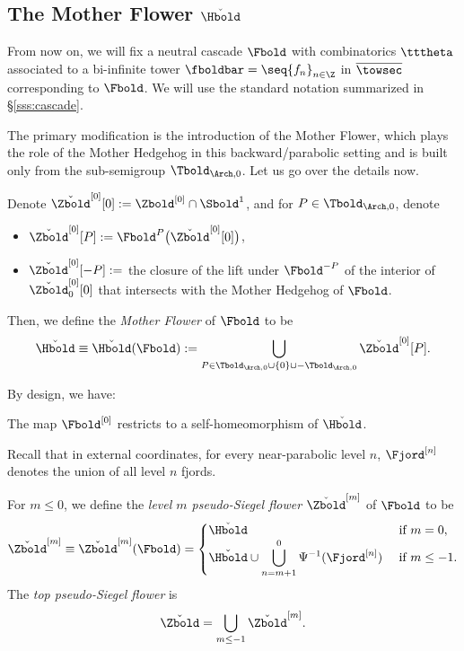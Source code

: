 \documentclass{amsart}
\begin{document}
\subsection{The Mother Flower $\check{\Hbold}$}

From now on, we will fix a neutral cascade $\Fbold$ with combinatorics $\tttheta$ associated to a bi-infinite tower $\fboldbar = \seq{f_n}_{n\in\Z}$ in $\overline{\towsec}$ corresponding to $\Fbold$.
We will use the standard notation summarized in \S\ref{sss:cascade}.

The primary modification is the introduction of the Mother Flower, which plays the role of the Mother Hedgehog in this backward/parabolic setting and is built only from the sub-semigroup $\Tbold_{\Arch,0}$.
Let us go over the details now.

\begin{definition}
    Denote $\check{\Zbold}^{[0]}[0] := \Zbold^{[0]} \cap \Sbold^1$, and for $P \in \Tbold_{\Arch,0}$, denote 
    \begin{itemize}
        \item $\check{\Zbold}^{[0]}[P] := \Fbold^P \big(\check{\Zbold}^{[0]}[0] \big)$,
        \item $\check{\Zbold}^{[0]}[-P] :=$ the closure of the lift under $\Fbold^{-P}$ of the interior of $\check{\Zbold}_0^{[0]}[0]$ that intersects with the Mother Hedgehog of $\Fbold$.
    \end{itemize}
    Then, we define the \emph{Mother Flower} of $\Fbold$ to be 
    \[
        \check{\Hbold} \equiv \check{\Hbold}(\Fbold) := \bigcup_{P \in \Tbold_{\Arch,0} \cup \{0\} \cup -\Tbold_{\Arch,0}} \check{\Zbold}^{[0]}[P].
    \]
\end{definition}

By design, we have:

\begin{lemma}
\label{lem:modified-mother-hedgehog}
    The map $\Fbold^{[0]}$ restricts to a self-homeomorphism of $\check{\Hbold}$.
\end{lemma}

Recall that in external coordinates, for every near-parabolic level $n$, $\Fjord^{[n]}$ denotes the union of all level $n$ fjords.

\begin{definition}
    For $m \leq 0$, we define the \emph{level $m$ pseudo-Siegel flower} $\check{\Zbold}^{[m]}$ of $\Fbold$ to be
    \[
        \check{\Zbold}^{[m]} \equiv \check{\Zbold}^{[m]}(\Fbold) = 
        \begin{cases}
            \displaystyle \check{\Hbold} & \textnormal{ if } m = 0,\\
            \displaystyle \check{\Hbold} \cup \bigcup_{n = m+1}^{0} \Psi^{-1}(\Fjord^{[n]}) & \textnormal{ if } m \leq -1.
        \end{cases}
    \]
    The \emph{top pseudo-Siegel flower} is
    \[
        \check{\Zbold} = \bigcup_{m \leq -1} \check{\Zbold}^{[m]}.
    \]
\end{definition}
\end{document}
